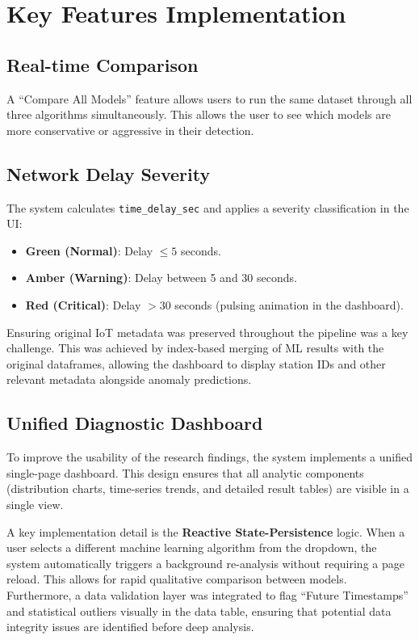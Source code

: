 \section{Key Features Implementation}

\subsection{Real-time Comparison}
A ``Compare All Models'' feature allows users to run the same dataset through all three algorithms simultaneously. This allows the user to see which models are more conservative or aggressive in their detection.

\subsection{Network Delay Severity}
The system calculates \texttt{time\_delay\_sec} and applies a severity classification in the UI:
\begin{itemize}
    \item \textbf{Green (Normal)}: Delay $\le 5$ seconds.
    \item \textbf{Amber (Warning)}: Delay between 5 and 30 seconds.
    \item \textbf{Red (Critical)}: Delay $> 30$ seconds (pulsing animation in the dashboard).
\end{itemize}

  Ensuring original IoT metadata was preserved throughout the pipeline was a key challenge. This was achieved by index-based merging of ML results with the original dataframes, allowing the dashboard to display station IDs and other relevant metadata alongside anomaly predictions.

\subsection{Unified Diagnostic Dashboard}
To improve the usability of the research findings, the system implements a unified single-page dashboard. This design ensures that all analytic components (distribution charts, time-series trends, and detailed result tables) are visible in a single view. 

A key implementation detail is the \textbf{Reactive State-Persistence} logic. When a user selects a different machine learning algorithm from the dropdown, the system automatically triggers a background re-analysis without requiring a page reload. This allows for rapid qualitative comparison between models. Furthermore, a data validation layer was integrated to flag ``Future Timestamps'' and statistical outliers visually in the data table, ensuring that potential data integrity issues are identified before deep analysis.
